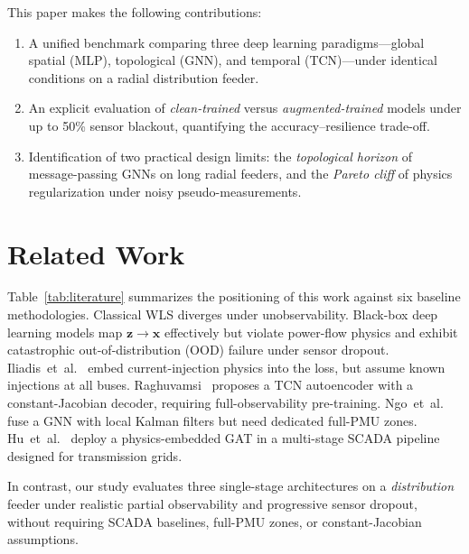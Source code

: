 \documentclass[conference]{IEEEtran}
\begin{document}
This paper makes the following contributions:
\begin{enumerate}
    \item A unified benchmark comparing three deep learning paradigms---global spatial (MLP), topological (GNN), and temporal (TCN)---under identical conditions on a radial distribution feeder.
    \item An explicit evaluation of \textit{clean-trained} versus \textit{augmented-trained} models under up to 50\% sensor blackout, quantifying the accuracy--resilience trade-off.
    \item Identification of two practical design limits: the \textit{topological horizon} of message-passing GNNs on long radial feeders, and the \textit{Pareto cliff} of physics regularization under noisy pseudo-measurements.
\end{enumerate}

\section{Related Work}

Table~\ref{tab:literature} summarizes the positioning of this work against six baseline methodologies. Classical WLS \cite{schweppe1970} diverges under unobservability. Black-box deep learning models map $\mathbf{z} \to \mathbf{x}$ effectively but violate power-flow physics and exhibit catastrophic out-of-distribution (OOD) failure under sensor dropout. Iliadis~et~al.~\cite{iliadis2025} embed current-injection physics into the loss, but assume known injections at all buses. Raghuvamsi~\cite{raghuvamsi2024} proposes a TCN autoencoder with a constant-Jacobian decoder, requiring full-observability pre-training. Ngo~et~al.~\cite{ngo2024} fuse a GNN with local Kalman filters but need dedicated full-PMU zones. Hu~et~al.~\cite{hu2025} deploy a physics-embedded GAT in a multi-stage SCADA pipeline designed for transmission grids.

In contrast, our study evaluates three single-stage architectures on a \textit{distribution} feeder under realistic partial observability and progressive sensor dropout, without requiring SCADA baselines, full-PMU zones, or constant-Jacobian assumptions.
\end{document}
